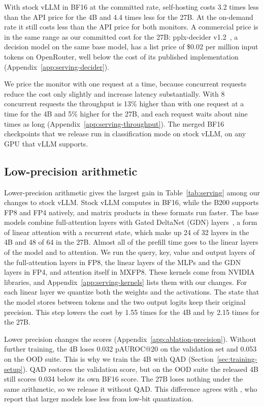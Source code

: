 With stock vLLM in BF16 at the committed rate, self-hosting costs 3.2 times less than the API price for the 4B and 4.4 times less for the 27B.
At the on-demand rate it still costs less than the API price for both monitors.
A commercial price is in the same range as our committed cost for the 27B: pplx-decider v1.2~\citep{perplexity2026decider}, a decision model on the same base model, has a list price of \$0.02 per million input tokens on OpenRouter, well below the cost of its published implementation (Appendix~\ref{app:serving-decider}).

We price the monitor with one request at a time, because concurrent requests reduce the cost only slightly and increase latency substantially.
With 8 concurrent requests the throughput is 13\% higher than with one request at a time for the 4B and 5\% higher for the 27B, and each request waits about nine times as long (Appendix~\ref{app:serving-throughput}).
The merged BF16 checkpoints that we release run in classification mode on stock vLLM, on any GPU that vLLM supports.

\subsection{Low-precision arithmetic}
\label{sec:serving-precision}

Lower-precision arithmetic gives the largest gain in Table~\ref{tab:serving} among our changes to stock vLLM.
Stock vLLM computes in BF16, while the B200 supports FP8 and FP4 natively, and matrix products in these formats run faster.
The base models combine full-attention layers with Gated DeltaNet (GDN) layers~\citep{yang2025gateddelta}, a form of linear attention with a recurrent state, which make up 24 of 32 layers in the 4B and 48 of 64 in the 27B.
Almost all of the prefill time goes to the linear layers of the model and to attention.
We run the query, key, value and output layers of the full-attention layers in FP8, the linear layers of the MLPs and the GDN layers in FP4, and attention itself in MXFP8.
These kernels come from NVIDIA libraries, and Appendix~\ref{app:serving-kernels} lists them with our changes.
For each linear layer we quantize both the weights and the activations.
The state that the model stores between tokens and the two output logits keep their original precision.
This step lowers the cost by 1.55 times for the 4B and by 2.15 times for the 27B.

Lower precision changes the scores (Appendix~\ref{app:ablation-precision}).
Without further training, the 4B loses 0.032 pAUROC@20 on the validation set and 0.053 on the OOD suite.
This is why we train the 4B with QAD (Section~\ref{sec:training-setup}).
QAD restores the validation score, but on the OOD suite the released 4B still scores 0.034 below its own BF16 score.
The 27B loses nothing under the same arithmetic, so we release it without QAD.
This difference agrees with \citet{ouyang2025lowbit}, who report that larger models lose less from low-bit quantization.

